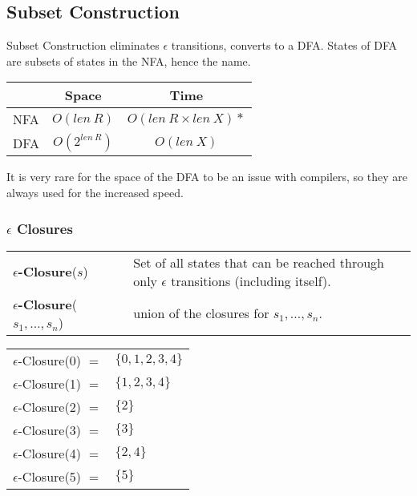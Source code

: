 \documentclass{report}
\begin{document}
\subsection*{Subset Construction}
Subset Construction eliminates $\epsilon$ transitions, converts to a DFA. States of DFA are subsets of states in the NFA, hence the name.
\begin{center}
	\begin{tabular}{c | c | c}
		    & \textbf{Space}   & \textbf{Time}                \\
		\hline
		NFA & $O(len \ R)$     & $O(len \ R \times len \ X)*$ \\
		DFA & $O(2^{len \ R})$ & $O(len \ X)$                 \\
	\end{tabular}
\end{center}
It is very rare for the space of the DFA to be an issue with compilers, so they are always used for the increased speed.
\subsubsection*{$\epsilon$ Closures}
\begin{center}
	\begin{tabular}{l l}
		\textbf{$\epsilon$-Closure}($s$)               & Set of all states that can be reached through only $\epsilon$ transitions (including itself). \\
		\textbf{$\epsilon$-Closure}($s_1, \dots, s_n$) & union of the closures for $s_1, \dots, s_n$.                                                  \\
	\end{tabular}
\end{center}
\begin{center}
	\begin{tabular}{r l}
		$\epsilon$-Closure(0) $=$ & $\{0,1,2,3,4\}$ \\
		$\epsilon$-Closure(1) $=$ & $\{1,2,3,4\}$   \\
		$\epsilon$-Closure(2) $=$ & $\{2\}$         \\
		$\epsilon$-Closure(3) $=$ & $\{3\}$         \\
		$\epsilon$-Closure(4) $=$ & $\{2,4\}$       \\
		$\epsilon$-Closure(5) $=$ & $\{5\}$         \\
	\end{tabular}
\end{center}
\end{document}
